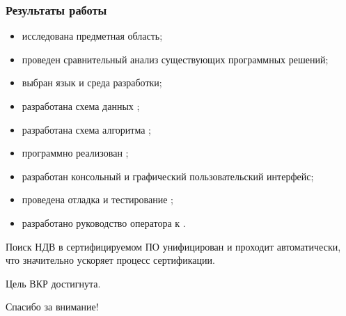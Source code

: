 \begin{frame}%
\frametitle{Результаты работы}
    \begin{itemize}
        \item исследована предметная область;
        \item проведен сравнительный анализ существующих программных решений;
        \item выбран язык и среда разработки;
        \item разработана схема данных {\ProgModule};
        \item разработана схема алгоритма {\ProgModule};
        \item программно реализован {\ProgModule};
        \item разработан консольный и графический пользовательский интерфейс;
        \item проведена отладка и тестирование {\ProgModule};
        \item разработано руководство оператора к {\ProgModule}.
    \end{itemize}

    Поиск НДВ в сертифицируемом ПО унифицирован и проходит автоматически,
    что значительно ускоряет процесс сертификации.
    
    Цель ВКР достигнута.
\end{frame}

\begin{frame}%

    \begin{center}
        \Huge Спасибо за внимание!
    \end{center}
    
\end{frame}
